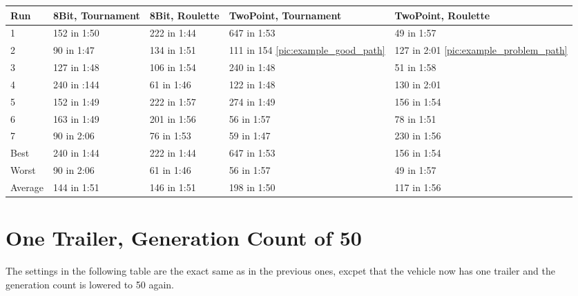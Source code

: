 \begin{center}
	\begin{tabular}{| l | l | l | p{3cm} | p{3cm}|}
		\hline
		Run 		& 8Bit, Tournament 	& 8Bit, Roulette 	& TwoPoint, Tournament 	& TwoPoint, Roulette	\\ \hline
		1				&	152 in 1:50				&	222 in 1:44			&	647 in 1:53						&	49 in 1:57					\\ \hline
		2				&	90 in 1:47				&	134 in 1:51			& 111 in 154 \ref{pic:example_good_path}			&	127 in 2:01 \ref{pic:example_problem_path}	\\ \hline		
		3				&	127 in 1:48				&	106 in 1:54			& 240 in 1:48						& 51 in 1:58					\\ \hline
		4				&	240 in :144				&	61 in 1:46			& 122 in 1:48						& 130 in 2:01					\\ \hline
		5				&	152 in 1:49				&	222 in 1:57			&	274 in 1:49						&	156 in 1:54					\\ \hline
		6				&	163 in 1:49				& 201 in 1:56			&	56 in 1:57						& 78 in 1:51					\\ \hline
		7				&	90 in 2:06				&	76 in 1:53			& 59 in 1:47						& 230 in 1:56					\\ \hline
		Best		&	240 in 1:44				&	222 in 1:44			&	647 in 1:53						&	156 in 1:54					\\ \hline
		Worst		&	90 in 2:06				&	61 in 1:46			&	56 in 1:57						& 49 in 1:57					\\ \hline
		Average	&	144 in 1:51				& 146 in 1:51			& 198 in 1:50						&	117 in 1:56					\\ \hline
		\hline
	\end{tabular}
\end{center}

\section{One Trailer, Generation Count of 50}
\label{sec:no_trailer_50}

The settings in the following table are the exact same as in the previous ones, excpet that the vehicle now has one trailer and the generation count is lowered to 50 again.

